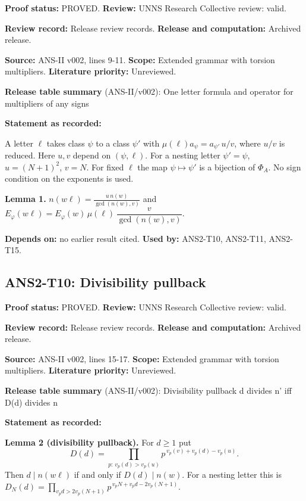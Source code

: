 \documentclass[
  11pt,
]{article}
\begin{document}
\textbf{Proof status:} PROVED. \textbf{Review:} UNNS Research Collective
review: valid.

\textbf{Review record:} Release review records. \textbf{Release and
computation:} Archived release.

\textbf{Source:} ANS-II v002, lines 9-11. \textbf{Scope:} Extended
grammar with torsion multipliers. \textbf{Literature priority:}
Unreviewed.

\textbf{Release table summary} (ANS-II/v002): One letter formula and
operator for multipliers of any signs

\textbf{Statement as recorded:}

A letter \(\ell\) takes class \(\psi\) to a class \(\psi'\) with
\(\mu(\ell)a_\psi=a_{\psi'}\,u/v\), where \(u/v\) is reduced. Here
\(u,v\) depend on \((\psi,\ell)\). For a nesting letter \(\psi'=\psi\),
\(u=(N+1)^2\), \(v=N\). For fixed \(\ell\) the map \(\psi\mapsto\psi'\)
is a bijection of \(\Phi_A\). No sign condition on the exponents is
used.

\textbf{Lemma 1.}
\(\displaystyle n(w\ell)=\frac{u\,n(w)}{\gcd(n(w),v)}\) and
\(E_\varphi(w\ell)=E_\varphi(w)\,\mu(\ell)\,\dfrac{v}{\gcd(n(w),v)}\).

\textbf{Depends on:} no earlier result cited. \textbf{Used by:}
ANS2-T10, ANS2-T11, ANS2-T15.

\hypertarget{ans2-t10-divisibility-pullback}{%
\subsection{ANS2-T10: Divisibility
pullback}\label{ans2-t10-divisibility-pullback}}

\textbf{Proof status:} PROVED. \textbf{Review:} UNNS Research Collective
review: valid.

\textbf{Review record:} Release review records. \textbf{Release and
computation:} Archived release.

\textbf{Source:} ANS-II v002, lines 15-17. \textbf{Scope:} Extended
grammar with torsion multipliers. \textbf{Literature priority:}
Unreviewed.

\textbf{Release table summary} (ANS-II/v002): Divisibility pullback d
divides n' iff D(d) divides n

\textbf{Statement as recorded:}

\textbf{Lemma 2 (divisibility pullback).} For \(d\ge1\) put
\[D(d)=\prod_{p:\,v_p(d)>v_p(u)}p^{\,v_p(v)+v_p(d)-v_p(u)}.\] Then
\(d\mid n(w\ell)\) if and only if \(D(d)\mid n(w)\). For a nesting
letter this is
\(D_N(d)=\prod_{v_p d>2v_p(N+1)}p^{\,v_pN+v_pd-2v_p(N+1)}\).
\end{document}
